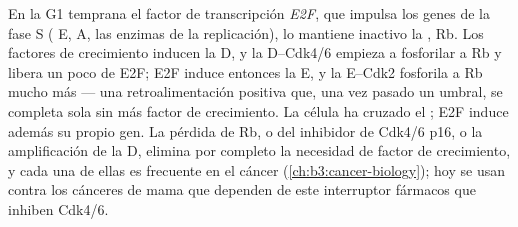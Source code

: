 \begin{proposition}\label{prop:b3:cell-cycle-apoptosis:rb}
En la G1 temprana el factor de transcripción \emph{E2F}, que impulsa los
genes de la fase S ( E,  A, las enzimas de la replicación),
lo mantiene inactivo la \emph{}, Rb. Los
factores de crecimiento inducen la  D, y la  D--Cdk4/6
empieza a fosforilar a Rb y libera un poco de E2F; E2F induce entonces la
 E, y la  E--Cdk2 fosforila a Rb mucho más --- una
retroalimentación positiva que, una vez pasado un umbral, se completa
sola sin más factor de crecimiento. La célula ha cruzado el ; E2F induce además su propio gen. La pérdida de Rb, o del
inhibidor de Cdk4/6 p16, o la amplificación de la  D, elimina por
completo la necesidad de factor de crecimiento, y cada una de ellas es
frecuente en el cáncer (\cref{ch:b3:cancer-biology}); hoy se usan contra
los cánceres de mama que dependen de este interruptor fármacos que
inhiben Cdk4/6.
\end{proposition}

